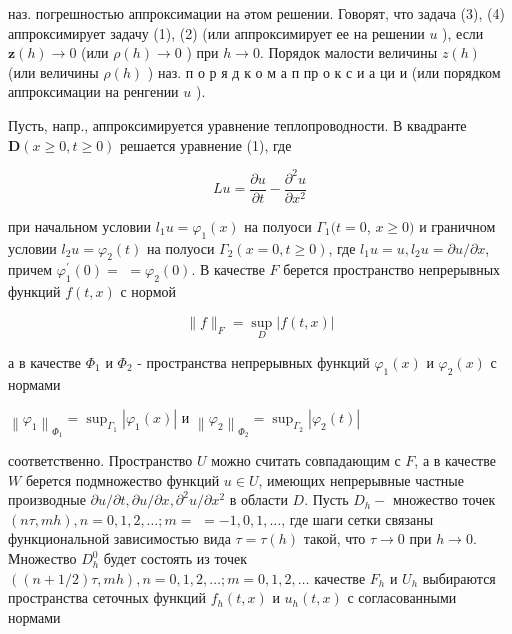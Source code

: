 \documentclass[10pt]{article}
\begin{document}
наз. погрешностью аппроксимации на әтом решении. Говорят, что задача (3), (4) аппроксимирует задачу (1), (2) (или аппроксимирует ее на решении $u$ ), если $\boldsymbol{z}(h) \rightarrow 0$ (или $\rho(h) \rightarrow 0$ ) при $h \rightarrow 0$. Порядок малости величины $z(h)$ (или величины $\rho(h)$ ) наз. п о р я д к о м а п пр о к с и а ци и (или порядком аппроксимации на ренгении $u$ ).



Пусть, напр., аппроксимируется уравнение теплопроводности. В квадранте $\boldsymbol{D}(x \geqslant 0, t \geqslant 0)$ решается уравнение (1), где



\[

L u=\frac{\partial u}{\partial t}-\frac{\partial^{2} u}{\partial x^{2}}

\]



при начальном условии $l_{1} u=\varphi_{1}(x)$ на полуоси $\Gamma_{1}(t=0$, $x \geqslant 0)$ и граничном условии $l_{2} u=\varphi_{2}(t)$ на полуоси $\Gamma_{2}(x=0, t \geqslant 0)$, где $l_{1} u=u, l_{2} u=\partial u / \partial x$, причем $\varphi_{1}^{\prime}(0)=$ $=\varphi_{2}(0)$. В качестве $F$ берется пространство непрерывных функций $f(t, x)$ с нормой



\[

\|f\|_{F}=\sup _{D}|f(t, x)|

\]



а в качестве $\Phi_{1}$ и $\Phi_{2}$ - пространства непрерывных функций $\varphi_{1}(x)$ и $\varphi_{2}(x)$ с нормами



$\left\|\varphi_{1}\right\|_{\Phi_{1}}=\sup _{\Gamma_{1}}\left|\varphi_{1}(x)\right|$ и $\left\|\varphi_{2}\right\|_{\Phi_{2}}=\sup _{\Gamma_{2}}\left|\varphi_{2}(t)\right|$



соответственно. Пространство $U$ можно считать совпадающим с $F$, а в качестве $W$ берется подмножество функций $u \in U$, имеющих непрерывные частные производные $\partial u / \partial t, \partial u / \partial x, \partial^{2} u / \partial x^{2}$ в области $D$. Пусть $D_{h}-$ множество точек $(n \tau, m h), n=0,1,2, \ldots ; m=$ $=-1,0,1, \ldots$, где шаги сетки связаны функциональной зависимостью вида $\tau=\tau(h)$ такой, что $\tau \rightarrow 0$ при $h \rightarrow 0$. Множество $D_{h}^{0}$ будет состоять из точек $((n+1 / 2) \tau, m h), n=0,1,2, \ldots ; m=0,1,2, \ldots$ качестве $F_{h}$ и $U_{h}$ выбираются пространства сеточных функций $f_{h}(t, x)$ и $u_{h}(t, x)$ с согласованными нормами
\end{document}
